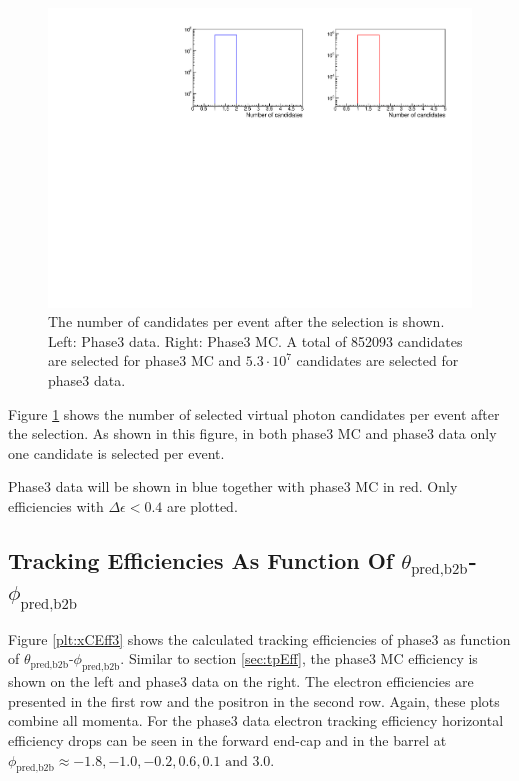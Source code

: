\documentclass[a4paper,11pt,twosided,final,german,openbib,pdftex,listof=totoc,bibliography=totoc]{scrbook}
\begin{document}
\begin{figure}[h!]
	\includegraphics[width=\textwidth]{Plots/master3/CCandP3.pdf}
	\caption[Total Number Of Events After The Selection Phase3]{The number of candidates per event after the selection is shown. Left: Phase3 data. Right: Phase3 MC. A total of 852093 candidates are selected for phase3 MC and $5.3\cdot10^7$ candidates are selected for phase3 data.}
	\label{fig:nCandAS3}
\end{figure}

Figure \ref{fig:nCandAS3} shows the number of selected virtual photon candidates per event after the selection. As shown in this figure, in both phase3 MC and phase3 data only one candidate is selected per event.




Phase3 data will be shown in blue together with phase3 MC in red. Only efficiencies with $\Delta \epsilon < 0.4$ are plotted.

\clearpage

\subsection{Tracking Efficiencies As Function Of $\theta_{\textrm{pred,b2b}}$-$\phi_{\textrm{pred,b2b}}$}
\label{sec:tpEff3}

Figure \ref{plt:xCEff3} shows the calculated tracking efficiencies of phase3 as function of $\theta_{\textrm{pred,b2b}}$-$\phi_{\textrm{pred,b2b}}$.
Similar to section \ref{sec:tpEff}, the phase3 MC efficiency is shown on the left and phase3 data on the right. The electron efficiencies are presented in the first row and the positron in the second row. Again, these plots combine all momenta. For the phase3 data electron tracking efficiency horizontal efficiency drops can be seen in the forward end-cap and in the barrel at $\phi_{\textrm{pred,b2b}} \approx -1.8, -1.0, -0.2, 0.6, 0.1 \textrm{ and }3.0$. 
\end{document}
